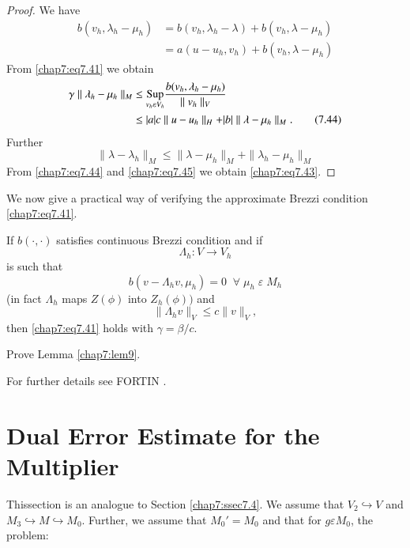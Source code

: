 \begin{proof}
We have 
\begin{align*}
b(v_h,\lambda_h-\mu_h) &= b(v_h,\lambda_h-\lambda)+b(v_h,\lambda-
\mu_h)\\
&= a(u-u_h,v_h)+b(v_h,\lambda -\mu_h)
\end{align*}
From \eqref{chap7:eq7.41} we obtain
\begin{align*}
\gamma\parallel\lambda_h-\mu_h\parallel_M &\leq \underset{v_h
\varepsilon V_h}{\operatorname{Sup}}\frac{b(v_h,\lambda_h-\mu_h)} {\parallel
v_h\parallel_V} \\
&\leq |a|c\parallel u-u_h\parallel_H+|b|\parallel\lambda-\mu_h
\parallel_M.\tag{7.44} \label{chap7:eq7.44}
\end{align*} \pageoriginale
Further
\setcounter{equation}{44}
\begin{equation}\label{chap7:eq7.45}
\parallel \lambda-\lambda_h\parallel_M\leq\parallel\lambda-\mu_h
\parallel_M+\parallel \lambda_h-\mu_h\parallel_M
\end{equation}
From \eqref{chap7:eq7.44} and \eqref{chap7:eq7.45} we obtain
\eqref{chap7:eq7.43}. 
\end{proof}

We now give a practical way of verifying the approximate Brezzi
condition \eqref{chap7:eq7.41}.

\setcounter{lem}{8}
\begin{lem}\label{chap7:lem9}
If $b(\cdotp,\cdotp)$ satisfies continuous Brezzi condition and if 
$$
\Lambda_h:V\to V_h
$$
is such that 
\begin{equation}\label{chap7:eq7.46}
b(v-\Lambda_hv,\mu_h)=0\; \;\forall\;\mu_h\;\varepsilon \;M_h
\end{equation}
(in fact $\Lambda_h$ maps $Z(\phi)$ into $Z_h(\phi))$ and 
\begin{equation}\label{chap7:eq7.47}
\parallel\Lambda_hv\parallel_V\leq c\parallel v\parallel_V,
\end{equation}
then \eqref{chap7:eq7.41} holds with $\gamma=\beta/c$.
\end{lem}

\begin{exercise}\label{chap7:exr5}
Prove Lemma \ref{chap7:lem9}.

For further details see FORTIN \cite{key18}.
\end{exercise}

\section{Dual Error Estimate for the  Multiplier} \label{chap7:ssec7.7} This\pageoriginale section is an
analogue to Section \ref{chap7:ssec7.4}. We assume that $V_2\hookrightarrow V$ 
and $M_3\hookrightarrow M\hookrightarrow M_0$. Further, we assume that
$M_0'=M_0$ and that for $g\varepsilon M_0$, the problem:

